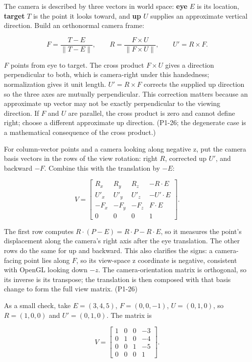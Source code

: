 The camera is described by three vectors in world space: \textbf{eye} \(E\) is its location, \textbf{target} \(T\) is the point it looks toward, and \textbf{up} \(U\) supplies an approximate vertical direction. Build an orthonormal camera frame:

\[
F=\frac{T-E}{\|T-E\|},\qquad
R=\frac{F\times U}{\|F\times U\|},\qquad
U'=R\times F.
\]

\(F\) points from eye to target. The cross product \(F\times U\) gives a direction perpendicular to both, which is camera-right under this handedness; normalization gives it unit length. \(U'=R\times F\) corrects the supplied up direction so the three axes are mutually perpendicular. This correction matters because an approximate up vector may not be exactly perpendicular to the viewing direction. If \(F\) and \(U\) are parallel, the cross product is zero and cannot define right; choose a different approximate up direction. (P1-26; the degenerate case is a mathematical consequence of the cross product.)

For column-vector points and a camera looking along negative z, put the camera basis vectors in the rows of the view rotation: right \(R\), corrected up \(U'\), and backward \(-F\). Combine this with the translation by \(-E\):

\[
V=\begin{bmatrix}
R_x&R_y&R_z&-R\cdot E\\
U'_x&U'_y&U'_z&-U'\cdot E\\
-F_x&-F_y&-F_z&F\cdot E\\
0&0&0&1
\end{bmatrix}.
\]

The first row computes \(R\cdot(P-E)=R\cdot P-R\cdot E\), so it measures the point's displacement along the camera's right axis after the eye translation. The other rows do the same for up and backward. This also clarifies the signs: a camera-facing point lies along \(F\), so its view-space z coordinate is negative, consistent with OpenGL looking down \(-z\). The camera-orientation matrix is orthogonal, so its inverse is its transpose; the translation is then composed with that basis change to form the full view matrix. (P1-26)

As a small check, take \(E=(3,4,5)\), \(F=(0,0,-1)\), \(U=(0,1,0)\), so \(R=(1,0,0)\) and \(U'=(0,1,0)\). The matrix is

\[
V=\begin{bmatrix}1&0&0&-3\\0&1&0&-4\\0&0&1&-5\\0&0&0&1\end{bmatrix}.
\]

